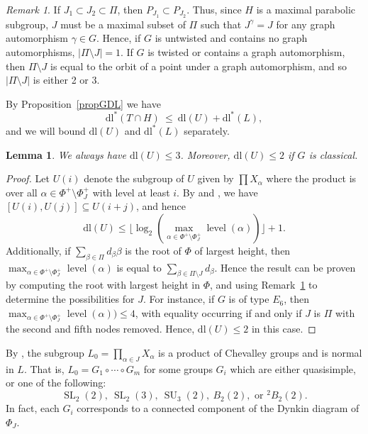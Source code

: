 \documentclass[11pt]{amsart}
\numberwithin{equation}{section}
\newtheorem{lemma}[theorem]{Lemma}
\theoremstyle{definition}
\theoremstyle{remark}
\newtheorem{remark}[theorem]{Remark}
\DeclareMathOperator{\SL}{SL}
\newcommand{\dll}{\mathrm{dl^*}}
\newcommand{\dl}{\mathrm{dl}}
\DeclareMathOperator{\SU}{SU}
\begin{document}
\begin{remark}\label{remark:sizeofJ}
    If $J_1 \subset J_2 \subset \Pi$, then $P_{J_1} \subset P_{J_2}$. Thus, since $H$ is a maximal parabolic subgroup, $J$ must be a maximal subset of $\Pi$ such that $J^\gamma = J$ for any graph automorphism $\gamma \in G$. Hence, if $G$ is untwisted and contains no graph automorphisms, $|\Pi \setminus J| = 1$. If $G$ is twisted or contains a graph automorphism, then $\Pi \setminus J$ is equal to the orbit of a point under a graph automorphism, and so $|\Pi \setminus J|$ is either 2 or 3.
\end{remark}

By Proposition~\ref{propGDL} we have
$$
 \dll(T \cap H) \> \leq \> \dl(U) + \dll(L) ,
$$
and we will bound $\dl(U)$ and $\dll(L)$ separately.

\begin{lemma} \label{lemUnip}
We always have $\dl(U) \leq 3$.
Moreover, $\dl(U) \leq 2$ if $G$ is classical.
\end{lemma}
\begin{proof}
Let $U(i)$ denote the subgroup of $U$ given by $\prod X_{\alpha}$ where the product is over all $\alpha \in \Phi^+ \setminus \Phi_J^+$ with level at least $i$. By \cite{ABS90} and \cite[Th.~5.2.2]{Car72}, we have $[U(i), U(j)] \subseteq U(i + j)$, and hence
\[
    \dl(U) \leq \lfloor\log_2(\max_{\alpha \in \Phi^+ \setminus \Phi_J^+} \operatorname{level}(\alpha)) \rfloor + 1 .
\]
Additionally, if $\sum_{\beta \in \Pi} d_\beta \beta$ is the root of $\Phi$ of largest height, then $\max_{\alpha \in \Phi^+ \setminus \Phi_J^+} \operatorname{level}(\alpha)$ is equal to $\sum_{\beta \in \Pi \setminus J} d_\beta$.
Hence the result can be proven by computing the root with largest height in $\Phi$, and using Remark~\ref{remark:sizeofJ} to determine the possibilities for $J$. For instance, if $G$ is of type $E_6$, then $\max_{\alpha \in \Phi^+ \setminus \Phi_J^+} \operatorname{level}(\alpha)) \leq 4$, with equality occurring if and only if $J$ is $\Pi$ with the second and fifth nodes removed. Hence, $\dl(U) \leq 2$ in this case.
\end{proof} 

By \cite[Th.~2.6.5(f)]{GLS94}, the subgroup $L_0 = \prod_{\alpha \in J} X_\alpha$ is a product of Chevalley groups and is normal in $L$. That is, $L_0 = G_1 \circ \cdots \circ G_m$ for some groups $G_i$ which are either quasisimple, or one of the following:
\[
    \SL_2(2), \> \SL_2(3), \> \SU_3(2), \> 
    B_2(2), \text{ or } {}^2B_2(2).
\]
In fact, each $G_i$ corresponds to a connected component of the Dynkin diagram of $\Phi_J$.
\end{document}
